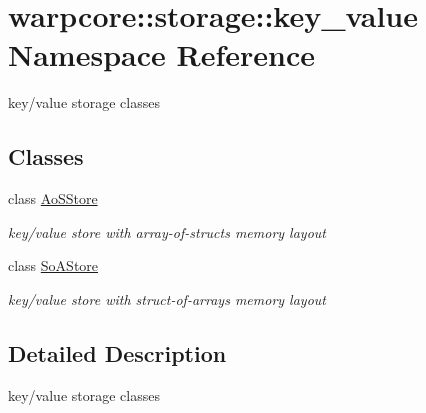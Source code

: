 \hypertarget{namespacewarpcore_1_1storage_1_1key__value}{}\section{warpcore\+:\+:storage\+:\+:key\+\_\+value Namespace Reference}
\label{namespacewarpcore_1_1storage_1_1key__value}


key/value storage classes  


\subsection*{Classes}
\begin{DoxyCompactItemize}
\item 
class \hyperlink{classwarpcore_1_1storage_1_1key__value_1_1AoSStore}{Ao\+S\+Store}
\begin{DoxyCompactList}\small\item\em key/value store with array-\/of-\/structs memory layout \end{DoxyCompactList}\item 
class \hyperlink{classwarpcore_1_1storage_1_1key__value_1_1SoAStore}{So\+A\+Store}
\begin{DoxyCompactList}\small\item\em key/value store with struct-\/of-\/arrays memory layout \end{DoxyCompactList}\end{DoxyCompactItemize}


\subsection{Detailed Description}
key/value storage classes 